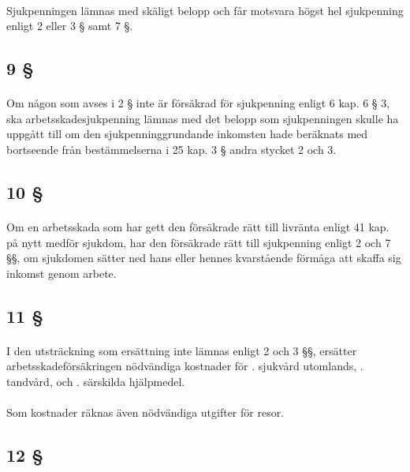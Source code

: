 \documentclass[a4paper,notitlepage,openany,10pt]{book}
\begin{document}
\paragraph*{}
Sjukpenningen lämnas med skäligt belopp och får motsvara högst hel sjukpenning enligt 2 eller 3 § samt 7 §.
\subsection*{9 §}
\paragraph*{}
Om någon som avses i 2 § inte är försäkrad för sjukpenning enligt 6 kap. 6 § 3, ska arbetsskadesjukpenning lämnas med det belopp som sjukpenningen skulle ha uppgått till om den sjukpenninggrundande inkomsten hade beräknats med bortseende från bestämmelserna i 25 kap. 3 § andra stycket 2 och 3.
\subsection*{10 §}
\paragraph*{}
Om en arbetsskada som har gett den försäkrade rätt till livränta enligt 41 kap. på nytt medför sjukdom, har den försäkrade rätt till sjukpenning enligt 2 och 7 §§, om sjukdomen sätter ned hans eller hennes kvarstående förmåga att skaffa sig inkomst genom arbete.
\subsection*{11 §}
\paragraph*{}
I den utsträckning som ersättning inte lämnas enligt 2 och 3 §§, ersätter arbetsskadeförsäkringen nödvändiga kostnader för
. sjukvård utomlands,
. tandvård, och
. särskilda hjälpmedel.
\paragraph*{}
Som kostnader räknas även nödvändiga utgifter för resor.
\subsection*{12 §}
\end{document}
